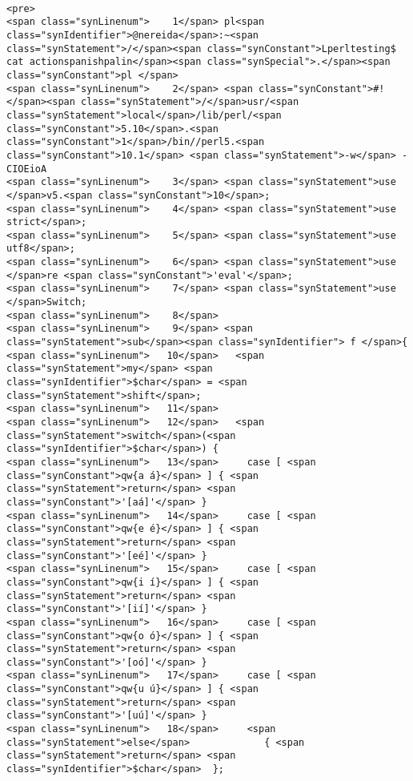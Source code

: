 \begin{verbatim}

<pre>
<span class="synLinenum">    1</span> pl<span class="synIdentifier">@nereida</span>:~<span class="synStatement">/</span><span class="synConstant">Lperltesting$ cat actionspanishpalin</span><span class="synSpecial">.</span><span class="synConstant">pl </span>
<span class="synLinenum">    2</span> <span class="synConstant">#!</span><span class="synStatement">/</span>usr/<span class="synStatement">local</span>/lib/perl/<span class="synConstant">5.10</span>.<span class="synConstant">1</span>/bin//perl5.<span class="synConstant">10.1</span> <span class="synStatement">-w</span> -CIOEioA
<span class="synLinenum">    3</span> <span class="synStatement">use </span>v5.<span class="synConstant">10</span>;
<span class="synLinenum">    4</span> <span class="synStatement">use strict</span>;
<span class="synLinenum">    5</span> <span class="synStatement">use utf8</span>;
<span class="synLinenum">    6</span> <span class="synStatement">use </span>re <span class="synConstant">'eval'</span>;
<span class="synLinenum">    7</span> <span class="synStatement">use </span>Switch;
<span class="synLinenum">    8</span> 
<span class="synLinenum">    9</span> <span class="synStatement">sub</span><span class="synIdentifier"> f </span>{
<span class="synLinenum">   10</span>   <span class="synStatement">my</span> <span class="synIdentifier">$char</span> = <span class="synStatement">shift</span>;
<span class="synLinenum">   11</span> 
<span class="synLinenum">   12</span>   <span class="synStatement">switch</span>(<span class="synIdentifier">$char</span>) {
<span class="synLinenum">   13</span>     case [ <span class="synConstant">qw{a á}</span> ] { <span class="synStatement">return</span> <span class="synConstant">'[aá]'</span> }
<span class="synLinenum">   14</span>     case [ <span class="synConstant">qw{e é}</span> ] { <span class="synStatement">return</span> <span class="synConstant">'[eé]'</span> }
<span class="synLinenum">   15</span>     case [ <span class="synConstant">qw{i í}</span> ] { <span class="synStatement">return</span> <span class="synConstant">'[ií]'</span> }
<span class="synLinenum">   16</span>     case [ <span class="synConstant">qw{o ó}</span> ] { <span class="synStatement">return</span> <span class="synConstant">'[oó]'</span> }
<span class="synLinenum">   17</span>     case [ <span class="synConstant">qw{u ú}</span> ] { <span class="synStatement">return</span> <span class="synConstant">'[uú]'</span> }
<span class="synLinenum">   18</span>     <span class="synStatement">else</span>             { <span class="synStatement">return</span> <span class="synIdentifier">$char</span>  };

\end{verbatim}
